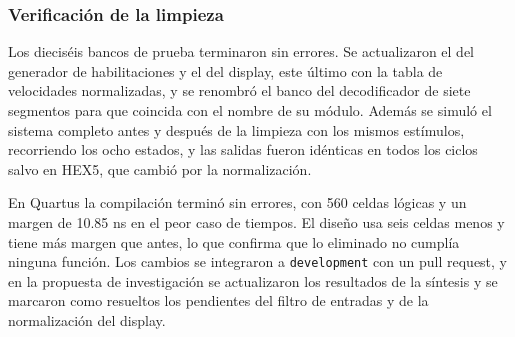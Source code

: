 \documentclass[11pt,letterpaper]{article}
\begin{document}
\subsubsection*{Verificación de la limpieza}

Los dieciséis bancos de prueba terminaron sin errores. Se actualizaron el del generador de habilitaciones y el del display, este último con la tabla de velocidades normalizadas, y se renombró el banco del decodificador de siete segmentos para que coincida con el nombre de su módulo. Además se simuló el sistema completo antes y después de la limpieza con los mismos estímulos, recorriendo los ocho estados, y las salidas fueron idénticas en todos los ciclos salvo en HEX5, que cambió por la normalización.

En Quartus la compilación terminó sin errores, con 560 celdas lógicas y un margen de 10.85 ns en el peor caso de tiempos. El diseño usa seis celdas menos y tiene más margen que antes, lo que confirma que lo eliminado no cumplía ninguna función. Los cambios se integraron a \texttt{development} con un pull request, y en la propuesta de investigación se actualizaron los resultados de la síntesis y se marcaron como resueltos los pendientes del filtro de entradas y de la normalización del display.
\end{document}
